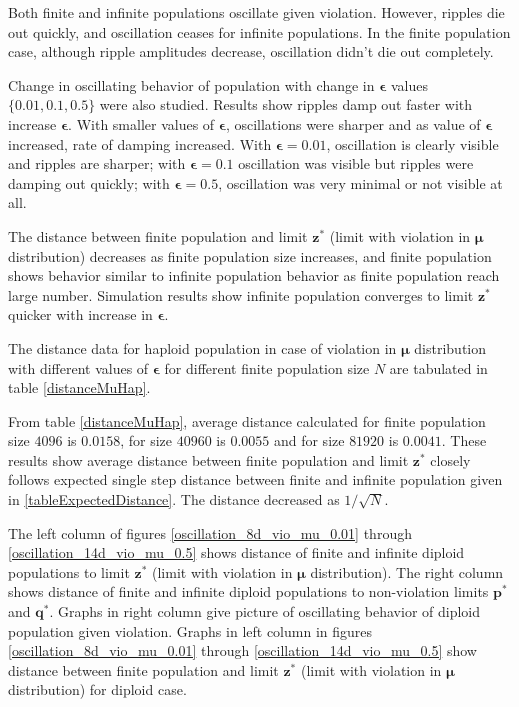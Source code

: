 Both finite and infinite populations oscillate given violation. However, ripples die out quickly, 
and oscillation ceases for infinite populations.
In the finite population case, although ripple amplitudes decrease, oscillation didn't die out completely. 

Change in oscillating behavior of population with change in $\bm{\epsilon}$ values $\{0.01, 0.1, 0.5\}$ were also studied. 
Results show ripples damp out faster with increase $\bm{\epsilon}$.
With smaller values of $\bm{\epsilon}$, oscillations were sharper and as value of $\bm{\epsilon}$ increased, 
rate of damping increased. With $\bm{\epsilon} = 0.01$, oscillation is clearly visible and ripples are sharper; with $\bm{\epsilon} = 0.1$ oscillation was visible 
but ripples were damping out quickly;  with $\bm{\epsilon} = 0.5$, oscillation was very minimal or not visible at all. 

The distance between finite population and limit $\bm{z}^\ast$ (limit with violation in $\bm{\mu}$ distribution) 
decreases as finite population size increases, 
and finite population shows behavior similar to infinite population behavior as finite population reach large number. 
Simulation results show infinite population converges 
to limit $\bm{z^\ast}$ quicker with increase in $\bm{\epsilon}$. 

The distance data for haploid population in case of violation in $\bm{\mu}$ distribution 
with different values of $\bm{\epsilon}$ for different finite population size $N$ are tabulated in table \ref{distanceMuHap}.

From table \ref{distanceMuHap}, average distance calculated for finite population size $4096$ is $0.0158$, 
for size $40960$ is $0.0055$ and for size $81920$ is $0.0041$. These results show average distance 
between finite population and limit $\bm{z^\ast}$ closely follows expected single step distance 
between finite and infinite population given in \ref{tableExpectedDistance}. The distance decreased as $1/\sqrt{N}$.


The left column of figures \ref{oscillation_8d_vio_mu_0.01} through \ref{oscillation_14d_vio_mu_0.5} 
shows distance of finite and infinite diploid populations to limit $\bm{z^\ast}$ (limit with violation in $\bm{\mu}$ distribution). The 
right column shows distance of finite and infinite diploid populations to non-violation limits $\bm{p^\ast}$ and $\bm{q^\ast}$. 
Graphs in right column give picture of oscillating behavior of diploid population given violation. 
Graphs in left column in figures \ref{oscillation_8d_vio_mu_0.01} through \ref{oscillation_14d_vio_mu_0.5} show distance 
between finite population and limit $\bm{z}^\ast$ (limit with violation in $\bm{\mu}$ distribution) for diploid case.


